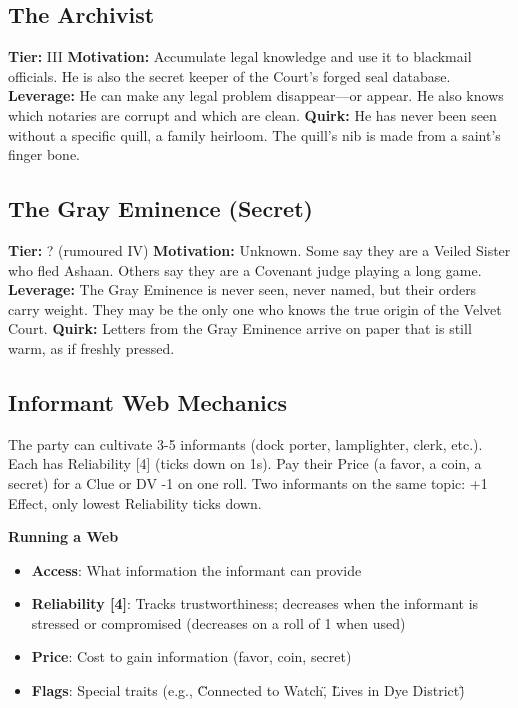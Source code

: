 \documentclass[10pt,twoside]{book}
\begin{document}
\subsection{The Archivist}
\textbf{Tier:} III  
\textbf{Motivation:} Accumulate legal knowledge and use it to blackmail officials. He is also the secret keeper of the Court's forged seal database.  
\textbf{Leverage:} He can make any legal problem disappear---or appear. He also knows which notaries are corrupt and which are clean.  
\textbf{Quirk:} He has never been seen without a specific quill, a family heirloom. The quill's nib is made from a saint's finger bone.

\subsection{The Gray Eminence (Secret)}
\textbf{Tier:} ? (rumoured IV)  
\textbf{Motivation:} Unknown. Some say they are a Veiled Sister who fled Ashaan. Others say they are a Covenant judge playing a long game.  
\textbf{Leverage:} The Gray Eminence is never seen, never named, but their orders carry weight. They may be the only one who knows the true origin of the Velvet Court.  
\textbf{Quirk:} Letters from the Gray Eminence arrive on paper that is still warm, as if freshly pressed.

\subsection{Informant Web Mechanics}
The party can cultivate 3-5 informants (dock porter, lamplighter, clerk, etc.). Each has Reliability [4] (ticks down on 1s). Pay their Price (a favor, a coin, a secret) for a Clue or DV -1 on one roll. Two informants on the same topic: +1 Effect, only lowest Reliability ticks down.

\noindent\textbf{Running a Web}
\begin{itemize}
\item \textbf{Access}: What information the informant can provide
\item \textbf{Reliability [4]}: Tracks trustworthiness; decreases when the informant is stressed or compromised (decreases on a roll of 1 when used)
\item \textbf{Price}: Cost to gain information (favor, coin, secret)
\item \textbf{Flags}: Special traits (e.g., \"Connected to Watch\", \"Lives in Dye District\")
\end{itemize}
\end{document}
